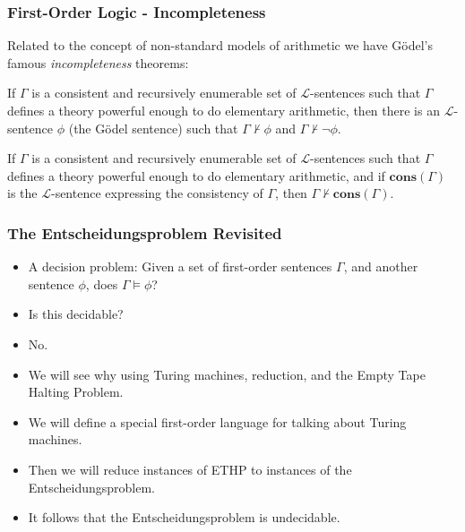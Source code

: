 \documentclass[handout]{beamer}
\begin{document}
\begin{frame}
\frametitle{First-Order Logic - Incompleteness} 
Related to the concept of non-standard models of arithmetic we have G\"odel's famous \emph{incompleteness} theorems:
\vspace{0.5cm}
\begin{theorem}
If $\Gamma$ is a consistent and recursively enumerable set of $\mathscr{L}$-sentences such that $\Gamma$ defines a theory powerful enough to do elementary arithmetic, then there is an $\mathscr{L}$-sentence $\phi$ (the G\"odel sentence) such that $\Gamma\not\vdash \phi$ and $\Gamma\not\vdash \neg\phi$.
\end{theorem}
\vspace{0.5cm}
\begin{theorem}
If $\Gamma$ is a consistent and recursively enumerable set of $\mathscr{L}$-sentences such that $\Gamma$ defines a theory powerful enough to do elementary arithmetic, and if $\mathbf{cons}(\Gamma)$ is the $\mathscr{L}$-sentence expressing the consistency of $\Gamma$, then $\Gamma\not\vdash \mathbf{cons}(\Gamma)$.
\end{theorem}
\end{frame}

\begin{frame}
\frametitle{The Entscheidungsproblem Revisited} 
\begin{itemize}
\item A decision problem: Given a set of first-order sentences $\Gamma$, and another sentence $\phi$, does $\Gamma\models \phi$?
\vspace{0.3cm}
\item Is this decidable?
\vspace{0.3cm}
\item No.
\vspace{0.3cm}
\item We will see why using Turing machines, reduction, and the Empty Tape Halting Problem.
\vspace{0.3cm}
\item We will define a special first-order language for talking about Turing machines.
\vspace{0.3cm}
\item Then we will reduce instances of ETHP to instances of the Entscheidungsproblem. 
\vspace{0.3cm}
\item It follows that the Entscheidungsproblem is undecidable.
\end{itemize}
\end{frame}
\end{document}
